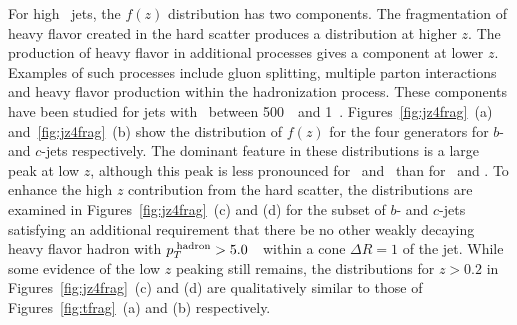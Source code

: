 For high \pT\ jets, the $f(z)$ distribution has two components. The fragmentation of heavy flavor created in the hard scatter produces a distribution at higher $z$. The production of heavy flavor in additional processes gives a component at lower $z$. Examples of such processes include gluon splitting, multiple parton interactions and heavy flavor production within the hadronization process.  These components have been studied for jets with
\ptJet\ between 500~\GeV\ and 1~\TeV. Figures~\ref{fig:jz4frag}~(a) and~\ref{fig:jz4frag}~(b) show the distribution of $f(z)$ for the four generators for $b$- and  $c$-jets respectively.  The dominant feature in these distributions is a large peak at low $z$, although this peak is less pronounced for \Herwig\ and \Herwigpp\ than for \Pythia\ and \PythiaE. To enhance the high $z$ contribution from the hard scatter, the distributions are examined
in Figures~\ref{fig:jz4frag}~(c) and (d) for the subset of $b$- and  $c$-jets satisfying an additional requirement that there be no other weakly decaying heavy flavor hadron with $p_T^{\rm\;hadron}>5.0$~\GeV\ within a cone $\Delta R=1$ of the jet.  While some evidence of the low $z$ peaking still remains, the distributions for $z>0.2$ in Figures~\ref{fig:jz4frag}~(c) and (d) are qualitatively similar to those of Figures~\ref{fig:tfrag}~(a) and (b) respectively.
\clearpage

